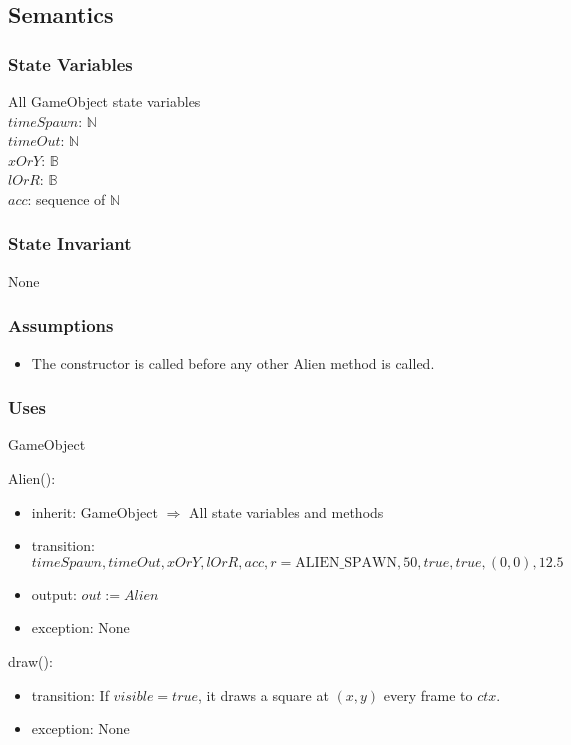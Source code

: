 \documentclass[12pt]{article}
\begin{document}
\subsection* {Semantics}

\subsubsection* {State Variables}

All GameObject state variables\\
$timeSpawn$: $\mathbb{N}$\\
$timeOut$: $\mathbb{N}$\\
$xOrY$: $\mathbb{B}$\\
$lOrR$: $\mathbb{B}$\\
$acc$: sequence of $\mathbb{N}$\\

\subsubsection* {State Invariant}

None

\subsubsection* {Assumptions}

\begin{itemize}
  \item The constructor is called before any other Alien method is called.
\end{itemize}

\subsubsection*{Uses}
GameObject

Alien():
\begin{itemize}
  \item inherit: GameObject $\Rightarrow$ All state variables and methods
  \item transition: $ timeSpawn, timeOut, xOrY, lOrR, acc, r = \mbox{ALIEN\_SPAWN}, 50, true, true, (0,0), 12.5 $\\
  \item output: $out := Alien$
  \item exception: None
\end{itemize}

\noindent draw():
\begin{itemize}
  \item transition: If $visible = true$, it draws a square at $(x,y)$ every frame to $ctx$.
  \item exception: None
\end{itemize}
\end{document}
